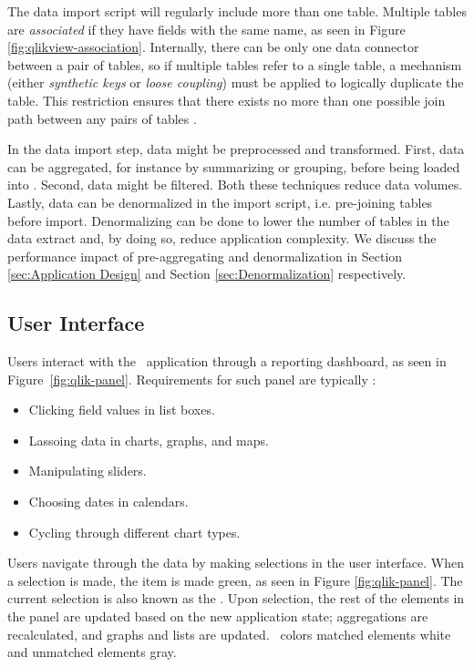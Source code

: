 The data import script will regularly include more than one table. Multiple tables are \textit{associated} if they have fields with the same name, as seen in Figure \ref{fig:qlikview-association}. Internally, there can be only one data connector between a pair of tables, so if multiple tables refer to a single table, a mechanism (either \textit{synthetic keys} or \textit{loose coupling}) must be applied to logically duplicate the table. This restriction ensures that there exists no more than one possible join path between any pairs of tables \cite{noauthor_undated-js}.

In the data import step, data might be preprocessed and transformed. First, data can be aggregated, for instance by summarizing or grouping, before being loaded into \qlikview. Second, data might be filtered. Both these techniques reduce data volumes. Lastly, data can be denormalized in the import script, i.e. pre-joining tables before import. Denormalizing can be done to lower the number of tables in the data extract and, by doing so, reduce application complexity. We discuss the performance impact of pre-aggregating and denormalization in Section \ref{sec:Application Design} and Section \ref{sec:Denormalization} respectively.

\subsection{User Interface}
\label{sub:User Interface}
Users interact with the \bd~application through a reporting dashboard, as seen in Figure~\ref{fig:qlik-panel}. Requirements for such panel are typically \cite{Qlik2014-vd}:
\begin{itemize}
  \item Clicking field values in list boxes.
  \item Lassoing data in charts, graphs, and maps.
  \item Manipulating sliders.
  \item Choosing dates in calendars.
  \item Cycling through different chart types.
\end{itemize}

Users navigate through the data by making selections in the user interface. When a selection is made, the item is made green, as seen in Figure \ref{fig:qlik-panel}. The current selection is also known as the . Upon selection, the rest of the elements in the panel are updated based on the new application state; aggregations are recalculated, and graphs and lists are updated. \qlikview~colors matched elements white and unmatched elements gray.

